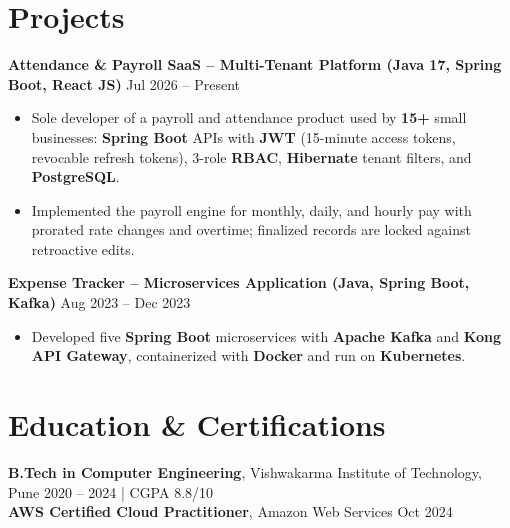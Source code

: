 \documentclass[a4paper,10pt]{article}
\begin{document}
\section*{Projects}

\textbf{Attendance \& Payroll SaaS -- Multi-Tenant Platform (Java 17, Spring Boot, React JS)} \hfill Jul 2026 -- Present
\begin{itemize}[leftmargin=*]
    \item Sole developer of a payroll and attendance product used by \textbf{15+} small businesses: \textbf{Spring Boot} APIs with \textbf{JWT} (15-minute access tokens, revocable refresh tokens), 3-role \textbf{RBAC}, \textbf{Hibernate} tenant filters, and \textbf{PostgreSQL}.
    \item Implemented the payroll engine for monthly, daily, and hourly pay with prorated rate changes and overtime; finalized records are locked against retroactive edits.
\end{itemize}

\textbf{Expense Tracker -- Microservices Application (Java, Spring Boot, Kafka)} \hfill Aug 2023 -- Dec 2023
\begin{itemize}[leftmargin=*]
    \item Developed five \textbf{Spring Boot} microservices with \textbf{Apache Kafka} and \textbf{Kong API Gateway}, containerized with \textbf{Docker} and run on \textbf{Kubernetes}.
\end{itemize}

\section*{Education \& Certifications}
\textbf{B.Tech in Computer Engineering}, Vishwakarma Institute of Technology, Pune \hfill 2020 -- 2024 \;|\; CGPA 8.8/10 \\
\textbf{AWS Certified Cloud Practitioner}, Amazon Web Services \hfill Oct 2024
\end{document}
